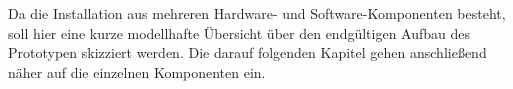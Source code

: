 Da die Installation aus mehreren Hardware- und Software-Komponenten besteht, soll hier eine kurze modellhafte Übersicht über den endgültigen Aufbau des Prototypen skizziert werden. Die darauf folgenden Kapitel gehen anschließend näher auf die einzelnen Komponenten ein.